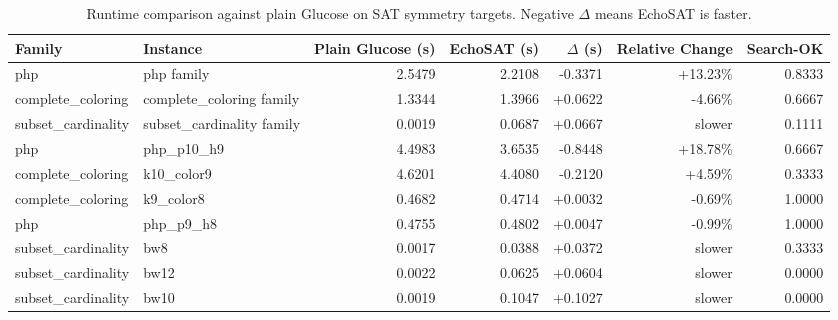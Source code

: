 \documentclass{article}
\begin{document}
\begin{table}[t]
\centering
\caption{Runtime comparison against plain Glucose on SAT symmetry targets. Negative $\Delta$ means EchoSAT is faster.}
\label{tab:sat_symmetry_runtime_vs_glucose}
\begin{tabular}{llrrrrr}
\toprule
Family & Instance & Plain Glucose (s) & EchoSAT (s) & $\Delta$ (s) & Relative Change & Search-OK \\
\midrule
php & php family & 2.5479 & 2.2108 & -0.3371 & +13.23\% & 0.8333 \\
complete\_coloring & complete\_coloring family & 1.3344 & 1.3966 & +0.0622 & -4.66\% & 0.6667 \\
subset\_cardinality & subset\_cardinality family & 0.0019 & 0.0687 & +0.0667 & slower & 0.1111 \\
\midrule
php & php\_p10\_h9 & 4.4983 & 3.6535 & -0.8448 & +18.78\% & 0.6667 \\
complete\_coloring & k10\_color9 & 4.6201 & 4.4080 & -0.2120 & +4.59\% & 0.3333 \\
complete\_coloring & k9\_color8 & 0.4682 & 0.4714 & +0.0032 & -0.69\% & 1.0000 \\
php & php\_p9\_h8 & 0.4755 & 0.4802 & +0.0047 & -0.99\% & 1.0000 \\
subset\_cardinality & bw8 & 0.0017 & 0.0388 & +0.0372 & slower & 0.3333 \\
subset\_cardinality & bw12 & 0.0022 & 0.0625 & +0.0604 & slower & 0.0000 \\
subset\_cardinality & bw10 & 0.0019 & 0.1047 & +0.1027 & slower & 0.0000 \\
\bottomrule
\end{tabular}
\end{table}
\end{document}
